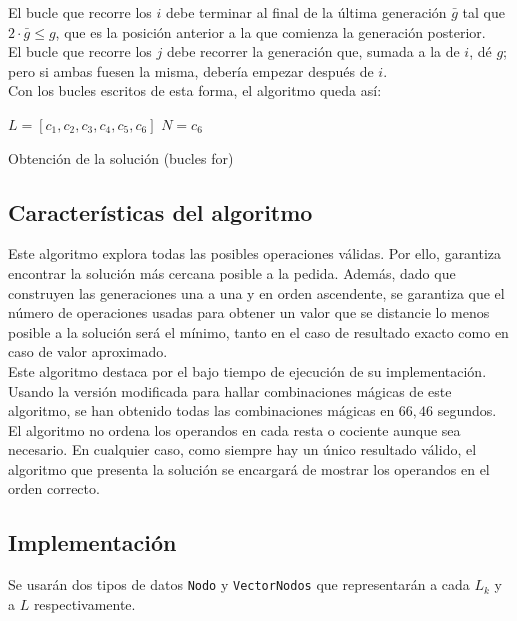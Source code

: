 El bucle que recorre los $i$ debe terminar al final de la última generación $\bar g$ tal que $2\cdot \bar g \le g$, que es la posición anterior a la que comienza la generación posterior. \\

El bucle que recorre los $j$ debe recorrer la generación que, sumada a la de $i$, dé $g$; pero si ambas fuesen la misma, debería empezar después de $i$. \\

Con los bucles escritos de esta forma, el algoritmo queda así:

\begin{algorithm}[H]
	
	$L = [c_1, c_2, c_3, c_4, c_5, c_6]$\;
	$N = c_6$\;
	\caption{Obtención de la solución (bucles for)}
\end{algorithm}

\subsection{Características del algoritmo}
Este algoritmo explora todas las posibles operaciones válidas.
Por ello, garantiza encontrar la solución más cercana posible a la pedida.
Además, dado que construyen las generaciones una a una y en orden ascendente,
se garantiza que el número de operaciones usadas para obtener un valor que se
distancie lo menos posible a la solución será el mínimo, tanto en el caso de
resultado exacto como en caso de valor aproximado.\\

Este algoritmo destaca por el bajo tiempo de ejecución de su implementación. Usando la versión modificada para hallar combinaciones mágicas de este algoritmo, se han obtenido todas las combinaciones mágicas en $66,46$ segundos.\\

El algoritmo no ordena los operandos en cada resta o cociente aunque sea necesario.
En cualquier caso, como siempre hay un único resultado válido, el algoritmo que
presenta la solución se encargará de mostrar los operandos en el orden correcto.

\subsection{Implementación}

Se usarán dos tipos de datos \texttt{Nodo} y \texttt{VectorNodos} que representarán a cada $L_k$ y a $L$ respectivamente.


